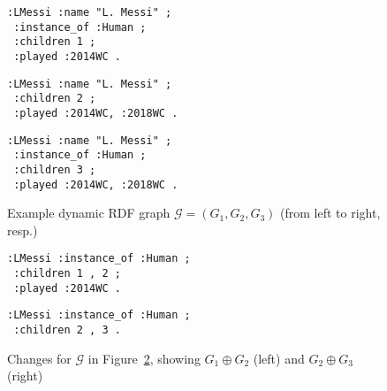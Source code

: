 \documentclass[runningheads]{llncs}
\begin{document}
%
%
%	
%	
%	
%

\begin{figure}[!t]
{\centering
	\begin{minipage}{0.32\textwidth}
	\begin{lstlisting}[style=sparqld]
:LMessi :name "L. Messi" ;
 :instance_of :Human ;
 :children 1 ;
 :played :2014WC .
	\end{lstlisting}
	\end{minipage}	
\hfill
\begin{minipage}{0.32\textwidth}
	\begin{lstlisting}[style=sparqld]
:LMessi :name "L. Messi" ;
 :children 2 ;
 :played :2014WC, :2018WC .
	\end{lstlisting}
\end{minipage}	
\hfill
\begin{minipage}{0.32\textwidth}
	\begin{lstlisting}[style=sparqld]
:LMessi :name "L. Messi" ;
 :instance_of :Human ;
 :children 3 ;
 :played :2014WC, :2018WC .
	\end{lstlisting}
\end{minipage}	
}

\caption{Example dynamic RDF graph $\mathcal{G} = (G_1, G_2, G_3)$ (from left to right, resp.) \label{fig:dg}}
\end{figure}

\begin{figure}[!t]
{\centering
\hfill
	\begin{minipage}{0.35\textwidth}
	\begin{lstlisting}[style=sparqld]
:LMessi :instance_of :Human ;
 :children 1 , 2 ;
 :played :2014WC .
	\end{lstlisting}
	\end{minipage}	
\hfill
\begin{minipage}{0.35\textwidth}
	\begin{lstlisting}[style=sparqld]
:LMessi :instance_of :Human ;
 :children 2 , 3 .
	\end{lstlisting}
\end{minipage}	
\hfill
}
\caption{Changes for $\mathcal{G}$ in Figure~\ref{fig:dgc}, showing $G_1 \oplus G_2$ (left) and $G_2 \oplus G_3$ (right) \label{fig:dgc}}
\end{figure}
\end{document}
